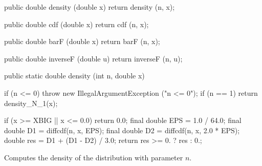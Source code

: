 \begin{code}\begin{hide}

   public double density (double x) {
      return density (n, x);
   }

   public double cdf (double x) {
      return cdf (n, x);
   }

   public double barF (double x) {
      return barF (n, x);
   }

   public double inverseF (double u) {
      return inverseF (n, u);
   }\end{hide}

   public static double density (int n, double x)\begin{hide} {
      if (n <= 0)
         throw new IllegalArgumentException ("n <= 0");
      if (n == 1)
         return density_N_1(x);

      if (x >= XBIG || x <= 0.0)
         return 0.0;
      final double EPS = 1.0 / 64.0;
      final double D1 = diffcdf(n, x, EPS);
      final double D2 = diffcdf(n, x, 2.0 * EPS);
      double res = D1 + (D1 - D2) / 3.0;
      return res >= 0. ? res : 0.;
   }\end{hide}
\end{code}
\begin{tabb} Computes the density of the \ad{} distribution with parameter $n$.
\end{tabb}
